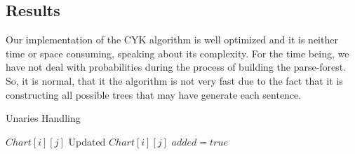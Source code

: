 \documentclass[a4paper,11pt]{article}
\begin{document}
\subsection{Results}
Our implementation of the CYK algorithm is well optimized and it is neither time or space consuming, speaking about its complexity. For the time being, we have not deal with probabilities during the process of building the parse-forest. So, it is normal, that it the algorithm is not very fast due to the fact that it is constructing all possible trees that may have generate each sentence.

\begin{algorithm}[t!]
\caption{Unaries Handling}
\label{unaries}
\begin{small}
\begin{algorithmic}[1]
$Chart[i][j]$
Updated $Chart[i][j]$
\STATE $added = true$
\ENDFOR
\ENDFOR
\ENDWHILE
\end{algorithmic}
\end{small}
\end{algorithm}
\end{document}
